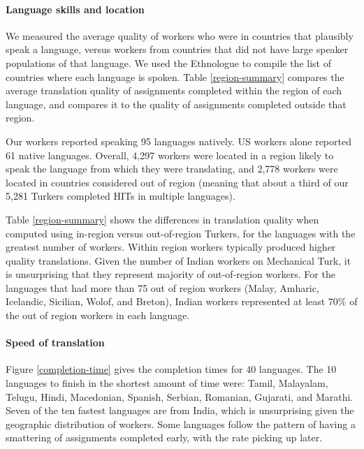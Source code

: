 \documentclass[11pt]{article}
\begin{document}
\paragraph{Language skills and location}

We measured the average quality of workers who were in countries that plausibly speak a language, versus workers from countries that did not have large speaker populations of that language.  We used the Ethnologue \cite{ethnologue} to compile the list of countries where each language is spoken.  Table \ref{region-summary} compares the average translation quality of assignments completed within the region of each language, and compares it to the quality of assignments completed outside that region. 

Our workers reported speaking 95 languages natively. US workers alone reported 61 native languages. Overall, 4,297 workers were located in a region likely to speak the language from which they were translating, and 2,778 workers were located in countries considered out of region (meaning that about a third of our 5,281 Turkers completed HITs in multiple languages). 

Table \ref{region-summary} shows the differences in translation quality when computed using in-region versus out-of-region Turkers, for the languages with the greatest number of workers.  Within region workers typically produced higher quality translations. 
Given the number of Indian workers on Mechanical Turk, it is unsurprising that they represent majority of out-of-region workers.  For the languages that had more than 75 out of region workers (Malay, Amharic, Icelandic, Sicilian, Wolof, and Breton), Indian workers represented at least 70\% of the out of region workers in each language. 



\paragraph{Speed of translation}


Figure \ref{completion-time} gives the completion times for 40 languages.  
The 10 languages to finish in the shortest amount of time were: Tamil, Malayalam, Telugu, Hindi, Macedonian, Spanish, Serbian, Romanian, Gujarati, and Marathi. Seven of the ten fastest languages are from India, which is unsurprising given the geographic distribution of workers.  Some languages follow the pattern of having a smattering of assignments completed early, with the rate picking up later. 
\end{document}
